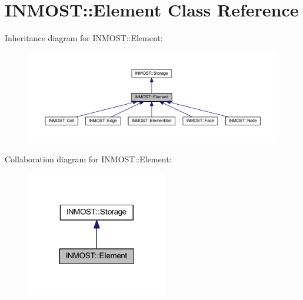 \hypertarget{classINMOST_1_1Element}{\section{I\-N\-M\-O\-S\-T\-:\-:Element Class Reference}
\label{classINMOST_1_1Element}
}


Inheritance diagram for I\-N\-M\-O\-S\-T\-:\-:Element\-:
\nopagebreak
\begin{figure}[H]
\begin{center}
\leavevmode
\includegraphics[width=350pt]{classINMOST_1_1Element__inherit__graph}
\end{center}
\end{figure}


Collaboration diagram for I\-N\-M\-O\-S\-T\-:\-:Element\-:
\nopagebreak
\begin{figure}[H]
\begin{center}
\leavevmode
\includegraphics[width=175pt]{classINMOST_1_1Element__coll__graph}
\end{center}
\end{figure}
